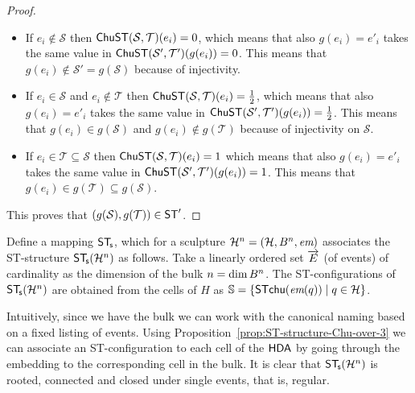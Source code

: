 \begin{proof}
        \begin{itemize}
            \item If $e_{i} \not\in \mathcal{S}$ then $\mathsf{ChuST}(\mathcal{S},\mathcal{T})(e_{i})=0$, which means that also $g(e_{i})=e'_{i}$ takes the same value in $\mathsf{ChuST}(\mathcal{S}',\mathcal{T}')(g(e_{i}))=0$. This means that $g(e_{i})\not\in \mathcal{S}'=g(\mathcal{S})$ because of injectivity.
            \item If $e_{i}\in \mathcal{S}$ and $e_{i} \not\in \mathcal{T}$ then $\mathsf{ChuST}(\mathcal{S},\mathcal{T})(e_{i})=\frac{1}{2}$, which means that also $g(e_{i})=e'_{i}$ takes the same value in $\mathsf{ChuST}(\mathcal{S}',\mathcal{T}')(g(e_{i}))=\frac{1}{2}$. This means that $g(e_{i})\in g(\mathcal{S})$ and $g(e_{i}) \not\in g(\mathcal{T})$ because of injectivity on $\mathcal{S}$.
            \item If $e_{i}\in \mathcal{T} \subseteq \mathcal{S}$ then $\mathsf{ChuST}(\mathcal{S},\mathcal{T})(e_{i})=1$ which means that also $g(e_{i})=e'_{i}$ takes the same value in $\mathsf{ChuST}(\mathcal{S}',\mathcal{T}')(g(e_{i}))=1$. This means that $g(e_{i}) \in g(\mathcal{T}) \subseteq g(\mathcal{S})$.
        \end{itemize}
    
        This proves that $(g(\mathcal{S}),g(\mathcal{T}))\in\mathsf{ST}'$.
    
    \end{proof}

    \begin{definition}
        \label{def:sculptures-to-ST}
        Define a mapping $\mathsf{ST}_{\!\mathsf{s}}$, which for a sculpture $\mathcal{H}^{n}=(\mathcal{H},B^{n},\textit{em})$ associates the ST-structure $\mathsf{ST}_{\!\mathsf{s}}(\mathcal{H}^{n})$ as follows. Take a linearly ordered set $\overrightarrow{E}$ (of events) of cardinality as the dimension of the bulk $n=\dim B^{n}$. The ST-configurations of $\mathsf{ST}_{\!\mathsf{s}}(\mathcal{H}^{n})$ are obtained from the cells of $H$ as $\mathbb{S}=\{\mathsf{ST}\mathsf{chu}(\textit{em}(q)) \mid q\in \mathcal{H}\}$.
    
    \end{definition}

    Intuitively, since we have the bulk we can work with the canonical naming based on a fixed listing of events. Using Proposition~\ref{prop:ST-structure-Chu-over-3} we can associate an ST-configuration to each cell of the $\text{\textup{\textsf{HDA}}}$ by going through the embedding to the corresponding cell in the bulk. It is clear that $\mathsf{ST}_{\!\mathsf{s}}(\mathcal{H}^{n})$ is rooted, connected and closed under single events, that is, regular.

